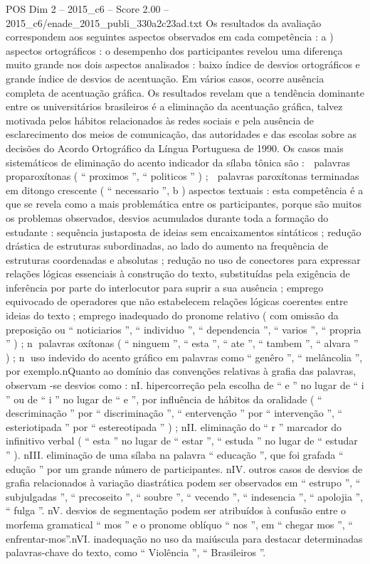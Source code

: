 \begin{textsample}{POS Dim 2 – 2015\_c6 – Score 2.00 – 2015\_c6/enade\_2015\_publi\_330a2c23ad.txt}
Os resultados da avaliação correspondem aos seguintes aspectos observados em cada competência : a ) aspectos ortográficos : o desempenho dos participantes revelou uma diferença muito grande nos dois aspectos analisados : baixo índice de desvios ortográficos e grande índice de desvios de acentuação.
Em vários casos, ocorre ausência completa de acentuação gráfica.
Os resultados revelam que a tendência dominante entre os universitários brasileiros é a eliminação da acentuação gráfica, talvez motivada pelos hábitos relacionados às redes sociais e pela ausência de esclarecimento dos meios de comunicação, das autoridades e das escolas sobre as decisões do Acordo Ortográfico da Língua Portuguesa de 1990.
Os casos mais sistemáticos de eliminação do acento indicador da sílaba tônica são :  palavras proparoxítonas ( “ proximos ”, “ politicos ” ) ;  palavras paroxítonas terminadas em ditongo crescente ( “ necessario ”, b ) aspectos textuais : esta competência é a que se revela como a mais problemática entre os participantes, porque são muitos os problemas observados, desvios acumulados durante toda a formação do estudante : sequência justaposta de ideias sem encaixamentos sintáticos ; redução drástica de estruturas subordinadas, ao lado do aumento na frequência de estruturas coordenadas e absolutas ; redução no uso de conectores para expressar relações lógicas essenciais à construção do texto, substituídas pela exigência de inferência por parte do interlocutor para suprir a sua ausência ; emprego equivocado de operadores que não estabelecem relações lógicas coerentes entre ideias do texto ; emprego inadequado do pronome relativo ( com omissão da preposição ou “ noticiarios ”, “ individuo ”, “ dependencia ”, “ varios ”, “ propria ” ) ; n palavras oxítonas ( “ ninguem ”, “ esta ”, “ ate ”, “ tambem ”, “ alvara ” ) ; n uso indevido do acento gráfico em palavras como “ genêro ”, “ melâncolia ”, por exemplo.nQuanto ao domínio das convenções relativas à grafia das palavras, observam -se desvios como : nI. hipercorreção pela escolha de “ e ” no lugar de “ i ” ou de “ i ” no lugar de “ e ”, por influência de hábitos da oralidade ( “ descriminação ” por “ discriminação ”, “ entervenção ” por “ intervenção ”, “ esteriotipada ” por “ estereotipada ” ) ; nII. eliminação do “ r ” marcador do infinitivo verbal ( “ esta ” no lugar de “ estar ”, “ estuda ” no lugar de “ estudar ” ). nIII. eliminação de uma sílaba na palavra “ educação ”, que foi grafada “ edução ” por um grande número de participantes. nIV. outros casos de desvios de grafia relacionados à variação diastrática podem ser observados em “ estrupo ”, “ subjulgadas ”, “ precoseito ”, “ soubre ”, “ vecendo ”, “ indesencia ”, “ apolojia ”, “ fulga ”. nV. desvios de segmentação podem ser atribuídos à confusão entre o morfema gramatical “ mos ” e o pronome oblíquo “ nos ”, em “ chegar mos ”, “ enfrentar-mos”.nVI. inadequação no uso da maiúscula para destacar determinadas palavras-chave do texto, como “ Violência ”, “ Brasileiros ”.

\end{textsample}
